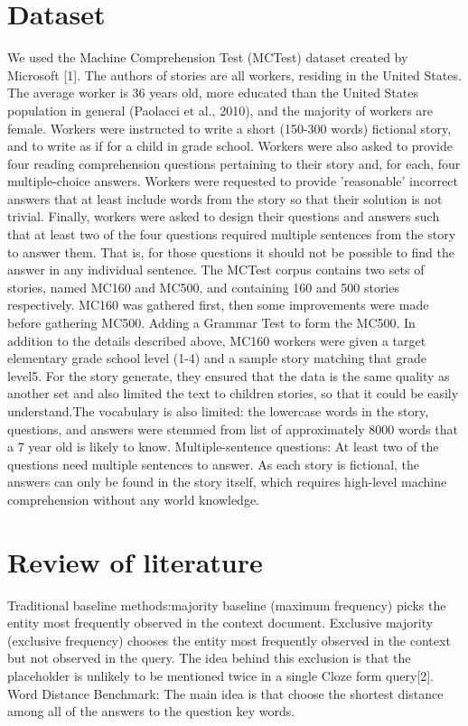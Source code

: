 \documentclass[runningheads,a4paper]{llncs}
\begin{document}
\section{Dataset}
We used the Machine Comprehension Test (MCTest) dataset created by Microsoft [1]. The authors of stories are all workers, residing in the United States. The average worker is 36 years old, more educated than the United States population in general (Paolacci et al., 2010), and the majority of workers are female. Workers were instructed to write a short (150-300 words) fictional story, and to write as if for a child in grade school. Workers were also asked to provide four reading comprehension questions pertaining to their story and, for each, four multiple-choice answers. Workers were requested to provide 'reasonable' incorrect answers that at least include words from the story so that their solution is not trivial. Finally, workers were asked to design their questions and answers such that at least two of the four questions required multiple sentences from the story to answer them. That is, for those questions it should not be possible to find the answer in any individual sentence. 
The MCTest corpus contains two sets of stories, named MC160 and MC500, and containing 160 and 500 stories respectively. MC160 was gathered first, then some improvements were made before gathering MC500. Adding a Grammar Test to form the MC500. 
In addition to the details described above, MC160 workers were given a target elementary grade school level (1-4) and a sample story matching that grade level5. 
For the story generate, they ensured that the data is the same quality as another set and also limited the text to children stories, so that it could be easily understand.The  vocabulary is also limited: the lowercase words in the story, questions, and answers were stemmed from list of approximately 8000 words that a 7 year old is likely to know. Multiple-sentence questions: At least two of the questions need multiple sentences to answer. As each story is fictional, the answers can only be found in the story itself, which requires high-level machine comprehension without any world knowledge.


\section{Review of literature}
Traditional baseline methods:majority baseline (maximum frequency) picks the entity most frequently observed in the context document.
Exclusive majority (exclusive frequency) chooses the entity most frequently observed in the context but not observed in the query. The idea behind this exclusion is that the placeholder is unlikely to be mentioned twice in a single Cloze form query[2]. 
Word Distance Benchmark: The main idea is that choose the shortest distance among all of the answers to the question key words.
\end{document}
